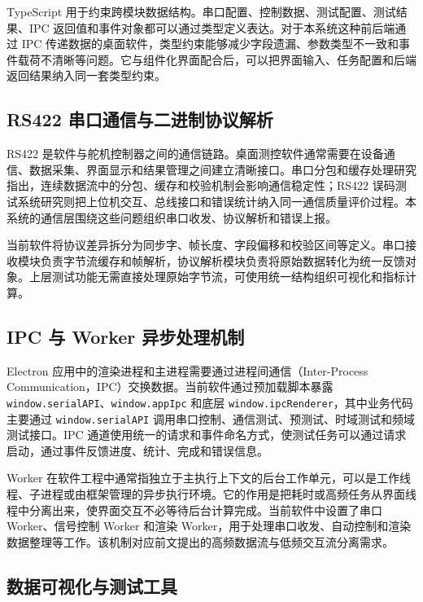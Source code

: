 TypeScript 用于约束跨模块数据结构。串口配置、控制数据、测试配置、测试结果、IPC 返回值和事件对象都可以通过类型定义表达。对于本系统这种前后端通过 IPC 传递数据的桌面软件，类型约束能够减少字段遗漏、参数类型不一致和事件载荷不清晰等问题。它与组件化界面配合后，可以把界面输入、任务配置和后端返回结果纳入同一套类型约束。

\subsection{RS422 串口通信与二进制协议解析}

RS422 是软件与舵机控制器之间的通信链路。桌面测控软件通常需要在设备通信、数据采集、界面显示和结果管理之间建立清晰接口\cite{zhang2017qtflowmeter}。串口分包和缓存处理研究指出，连续数据流中的分包、缓存和校验机制会影响通信稳定性\cite{wu2025serialpacket}；RS422 误码测试系统研究则把上位机交互、总线接口和错误统计纳入同一通信质量评价过程\cite{hu2026rs422ber}。本系统的通信层围绕这些问题组织串口收发、协议解析和错误上报。

当前软件将协议差异拆分为同步字、帧长度、字段偏移和校验区间等定义。串口接收模块负责字节流缓存和帧解析，协议解析模块负责将原始数据转化为统一反馈对象。上层测试功能无需直接处理原始字节流，可使用统一结构组织可视化和指标计算。

\subsection{IPC 与 Worker 异步处理机制}

Electron 应用中的渲染进程和主进程需要通过进程间通信（Inter-Process Communication，IPC）交换数据。当前软件通过预加载脚本暴露 \texttt{window.serialAPI}、\texttt{window.appIpc} 和底层 \texttt{window.ipcRenderer}，其中业务代码主要通过 \texttt{window.serialAPI} 调用串口控制、通信测试、预测试、时域测试和频域测试接口。IPC 通道使用统一的请求和事件命名方式，使测试任务可以通过请求启动，通过事件反馈进度、统计、完成和错误信息。

Worker 在软件工程中通常指独立于主执行上下文的后台工作单元，可以是工作线程、子进程或由框架管理的异步执行环境。它的作用是把耗时或高频任务从界面线程中分离出来，使界面交互不必等待后台计算完成。当前软件中设置了串口 Worker、信号控制 Worker 和渲染 Worker，用于处理串口收发、自动控制和渲染数据整理等工作。该机制对应前文提出的高频数据流与低频交互流分离需求。

\subsection{数据可视化与测试工具}

